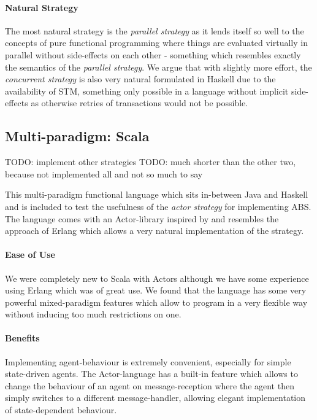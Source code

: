 \paragraph{Natural Strategy}
The most natural strategy is the \textit{parallel strategy} as it lends itself so well to the concepts of pure functional programming where things are evaluated virtually in parallel without side-effects on each other - something which resembles exactly the semantics of the \textit{parallel strategy}. We argue that with slightly more effort, the \textit{concurrent strategy} is also very natural formulated in Haskell due to the availability of STM, something only possible in a language without implicit side-effects as otherwise retries of transactions would not be possible.



\subsection{Multi-paradigm: Scala}
TODO: implement other strategies
TODO: much shorter than the other two, because not implemented all and not so much to say

This multi-paradigm functional language which sits in-between Java and Haskell and is included to test the usefulness of the \textit{actor strategy} for implementing ABS. The language comes with an Actor-library inspired by \cite{agha_actors:_1986} and resembles the approach of Erlang which allows a very natural implementation of the strategy.

\paragraph{Ease of Use}
We were completely new to Scala with Actors although we have some experience using Erlang which was of great use. We found that the language has some very powerful mixed-paradigm features which allow to program in a very flexible way without inducing too much restrictions on one.

\paragraph{Benefits}
Implementing agent-behaviour is extremely convenient, especially for simple state-driven agents. The Actor-language has a built-in feature which allows to change the behaviour of an agent on message-reception where the agent then simply switches to a different message-handler, allowing elegant implementation of state-dependent behaviour. 

